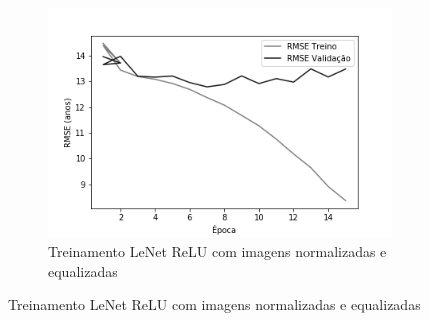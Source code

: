 \begin{figure}[hb!]
\begin{subfigure}[hb]{0.5\linewidth}
	\end{subfigure}%
  \begin{subfigure}[hb]{0.5\linewidth}
    \caption{Treinamento LeNet ReLU com imagens normalizadas e equalizadas}
    \label{fig:redeneuralbiologica}
    \includegraphics[width=\linewidth]{img/graficos-fase2/fig-history-lenet-relu-data-augmentation-21.png}%
  \end{subfigure}%
\end{figure}


